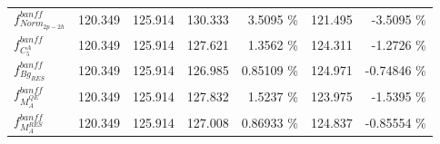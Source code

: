 \begin{table}
\begin{tabular}{| l | r | r | r  r | r  r |}
                                                        $f_{Norm_{2p-2h}}^{banff}$ &         120.349 & 125.914 & 130.333 &          3.5095 \%  &         121.495 &         -3.5095 \%  \\ 
                                                         $f_{C^{A}_{5}}^{banff}$ &         120.349 & 125.914 & 127.621 &          1.3562 \%  &         124.311 &         -1.2726 \%  \\ 
                                                          $f_{Bg_{RES}}^{banff}$ &         120.349 & 125.914 & 126.985 &         0.85109 \%  &         124.971 &        -0.74846 \%  \\ 
                                                          $f_{M_A^{QE}}^{banff}$ &         120.349 & 125.914 & 127.832 &          1.5237 \%  &         123.975 &         -1.5395 \%  \\ 
                                                         $f_{M_A^{RES}}^{banff}$ &         120.349 & 125.914 & 127.008 &         0.86933 \%  &         124.837 &        -0.85554 \%  \\ 

\end{tabular}
\end{table}
